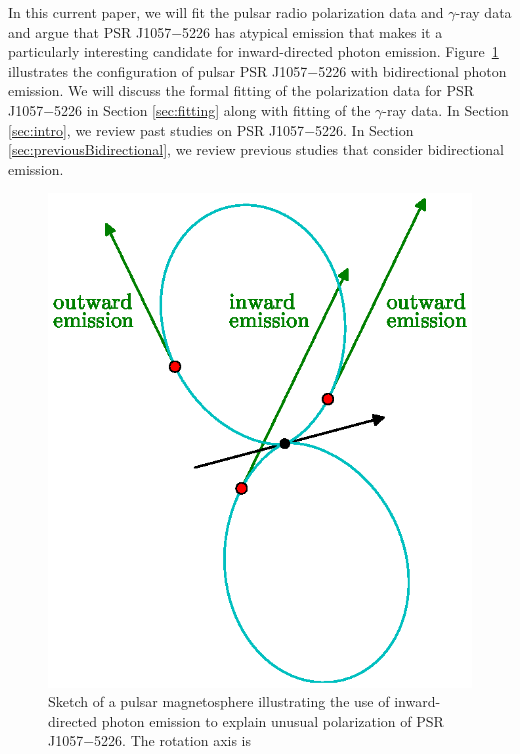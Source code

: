 In this current paper, we will fit the pulsar radio
polarization data and  $\gamma$-ray data and argue that
PSR J1057$-$5226 has atypical emission that makes it
a particularly interesting candidate for inward-directed photon emission.
Figure~\ref{fig:simpleFig} illustrates the configuration of 
pulsar PSR J1057$-$5226 with bidirectional photon emission.
We will discuss the formal fitting of the polarization data for PSR J1057$-$5226
in Section \ref{sec:fitting} along with fitting of the $\gamma$-ray data. 
In Section \ref{sec:intro}, we review past studies on PSR J1057$-$5226.
In Section \ref{sec:previousBidirectional}, we review
previous studies that consider bidirectional emission.

\begin{figure}[t!!]
\begin{center}
\includegraphics[scale=.8]{chapters/inwardDirectedPhotons/figures/magnetosphere.eps}
\caption[Sketch of a pulsar magnetosphere illustrating the use of inward-directed photon
emission to explain unusual polarization of PSR J1057$-$5226]{\label{fig:simpleFig}
Sketch of a pulsar magnetosphere illustrating the use of inward-directed photon
emission to explain unusual polarization of PSR J1057$-$5226. The rotation axis is
}
\end{center}
\end{figure}
